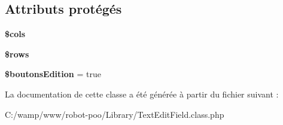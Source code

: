\subsection*{Attributs protégés}
\begin{DoxyCompactItemize}
\item 
\hypertarget{class_library_1_1_text_edit_field_aa0acedd535e0b46a4fffc4b147d3f545}{{\bfseries \$cols}}\label{class_library_1_1_text_edit_field_aa0acedd535e0b46a4fffc4b147d3f545}

\item 
\hypertarget{class_library_1_1_text_edit_field_ace2ec39e7df3899fa8df9640ec274b03}{{\bfseries \$rows}}\label{class_library_1_1_text_edit_field_ace2ec39e7df3899fa8df9640ec274b03}

\item 
\hypertarget{class_library_1_1_text_edit_field_ace5a0f123bd9d45871a7a6cb3e5c9d43}{{\bfseries \$boutons\+Edition} = true}\label{class_library_1_1_text_edit_field_ace5a0f123bd9d45871a7a6cb3e5c9d43}

\end{DoxyCompactItemize}


La documentation de cette classe a été générée à partir du fichier suivant \+:\begin{DoxyCompactItemize}
\item 
C\+:/wamp/www/robot-\/poo/\+Library/Text\+Edit\+Field.\+class.\+php\end{DoxyCompactItemize}
